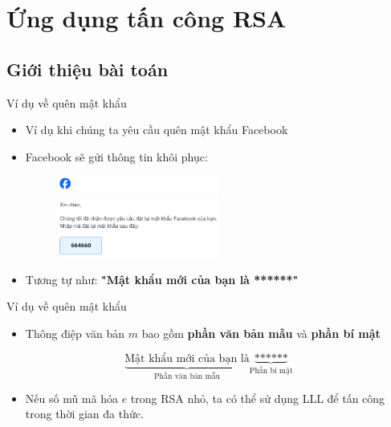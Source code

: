 \section{Ứng dụng tấn công RSA}

\subsection{Giới thiệu bài toán}

\begin{frame}{Ví dụ về quên mật khẩu}

\begin{itemize}
\item Ví dụ khi chúng ta yêu cầu quên mật khẩu Facebook
\item Facebook sẽ gửi thông tin khôi phục:

\begin{figure}[h]
\includegraphics[width=0.5\textwidth]{pictures/facebook.png}
\end{figure}

\item Tương tự như:
\textbf{"Mật khẩu mới của bạn là ******"}
\end{itemize}

\end{frame}
\begin{frame}{Ví dụ về quên mật khẩu}

\begin{itemize}
\item Thông điệp văn bản \(m \) bao gồm \textbf{phần văn bản mẫu} và \textbf{phần bí mật}
\end{itemize}

$$
\underbrace{\text{Mật khẩu mới của bạn là}}_{\text{Phần văn bản mẫu}}
\underbrace{\text{******}}_{\text{Phần bí mật}}
$$

\begin{itemize}
\item Nếu số mũ mã hóa \(e \) trong RSA nhỏ, ta có thể sử dụng LLL để tấn công trong thời gian đa thức.
\end{itemize}

\end{frame}

